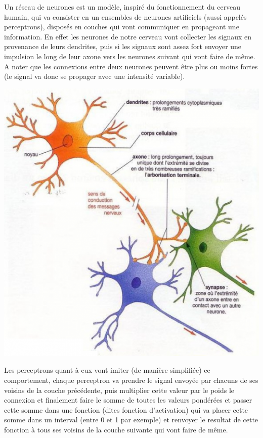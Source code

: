 \documentclass{article}
\begin{document}
Un réseau de neurones est un modèle, inspiré du fonctionnement du cerveau humain, qui va consister en un ensembles de neurones artificiels (aussi appelés perceptrons), disposés en couches qui vont communiquer en propageant une information. En effet les neurones de notre cerveau vont collecter les signaux en provenance de leurs dendrites, puis si les signaux sont assez fort envoyer une impulsion le long de leur axone vers les neurones suivant qui vont faire de même. A noter que les connexions entre deux neurones peuvent être plus ou moins fortes (le signal va donc se propager avec une intensité variable).
\begin{center}
\includegraphics[scale=0.5]{neurones.png}
\end{center}

Les perceptrons quant à eux vont imiter (de manière simplifiée) ce comportement, chaque perceptron va prendre le signal envoyée par chacuns de ses voisins de la couche précédente, puis multiplier cette valeur par le poids le connexion et finalement faire le somme de toutes les valeurs pondérées et passer cette somme dans une fonction (dites fonction d'activation) qui va placer cette somme dans un interval (entre 0 et 1 par exemple) et renvoyer le resultat de cette fonction à tous ses voisins de la couche suivante qui vont faire de même.
\end{document}
